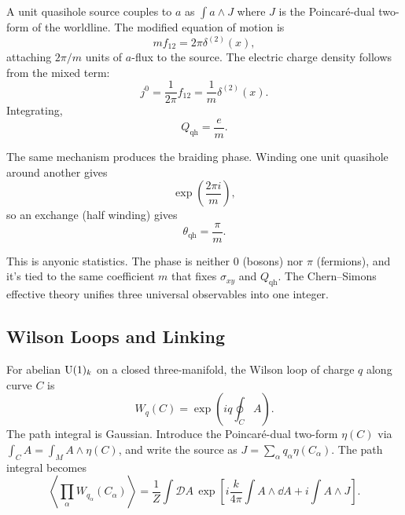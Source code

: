 A unit quasihole source couples to $a$ as $\int a\wedge J$ where $J$ is the Poincar\'{e}-dual two-form of the worldline. The modified equation of motion is
\begin{equation}
  m f_{12}=2\pi\delta^{(2)}(x),
  \label{eq:fqhe-quasihole-flux}
\end{equation}
attaching $2\pi/m$ units of $a$-flux to the source. The electric charge density follows from the mixed term:
\begin{equation}
  j^0=\frac{1}{2\pi}f_{12}
  =
  \frac{1}{m}\delta^{(2)}(x).
  \label{eq:fqhe-quasihole-charge-density}
\end{equation}
Integrating,
\begin{equation}
  Q_{\mathrm{qh}}=\frac{e}{m}.
  \label{eq:fqhe-quasihole-charge}
\end{equation}

The same mechanism produces the braiding phase. Winding one unit quasihole around another gives
\begin{equation}
  \exp\left(\frac{2\pi i}{m}\right),
  \label{eq:fqhe-full-braid}
\end{equation}
so an exchange (half winding) gives
\begin{equation}
  \theta_{\mathrm{qh}}=\frac{\pi}{m}.
  \label{eq:fqhe-exchange-angle}
\end{equation}

This is anyonic statistics. The phase is neither $0$ (bosons) nor $\pi$ (fermions), and it's tied to the same coefficient $m$ that fixes $\sigma_{xy}$ and $Q_{\mathrm{qh}}$. The Chern--Simons effective theory unifies three universal observables into one integer.

\subsection{Wilson Loops and Linking}
\label{subsec:fqhe-wilson-linking}

For abelian $\operatorname{U}(1)_k$ on a closed three-manifold, the Wilson loop of charge $q$ along curve $C$ is
\begin{equation}
  W_q(C)=\exp\left(iq\oint_C A\right).
  \label{eq:fqhe-wilson}
\end{equation}
The path integral is Gaussian. Introduce the Poincar\'{e}-dual two-form $\eta(C)$ via $\int_C A=\int_M A\wedge\eta(C)$, and write the source as $J=\sum_\alpha q_\alpha\eta(C_\alpha)$. The path integral becomes
\begin{equation}
  \left\langle\prod_\alpha W_{q_\alpha}(C_\alpha)\right\rangle
  =
  \frac{1}{Z}
  \int\mathcal DA\,
  \exp\left[
  i\frac{k}{4\pi}\int A\wedge\dd A
  +
  i\int A\wedge J
  \right].
  \label{eq:fqhe-gaussian-wilson}
\end{equation}

